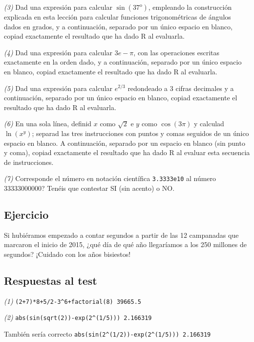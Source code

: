 \documentclass[]{book}
\theoremstyle{definition}
\theoremstyle{definition}
\theoremstyle{definition}
\theoremstyle{remark}
\begin{document}
\emph{(3)} Dad una expresión para calcular \(\sin(37^{\mathrm{o}})\), empleando la construcción explicada en esta lección para calcular funciones trigonométricas de ángulos dados en grados, y a continuación, separado por un único espacio en blanco, copiad exactamente el resultado que ha dado R al evaluarla.

\emph{(4)} Dad una expresión para calcular \(3e-\pi\), con las operaciones escritas exactamente en la orden dado, y a continuación, separado por un único espacio en blanco, copiad exactamente el resultado que ha dado R al evaluarla.

\emph{(5)} Dad una expresión para calcular \(e^{2/3}\) redondeado a 3 cifras decimales y a continuación, separado por un único espacio en blanco, copiad exactamente el resultado que ha dado R al evaluarla.

\emph{(6)} En una sola línea, definid \(x\) como \(\sqrt{2}\) e \(y\) como \(\cos(3\pi)\) y calculad \(\ln(x^{y})\); separad las tres instrucciones con puntos y comas seguidos de un único espacio en blanco. A continuación, separado por un espacio en blanco (sin punto y coma), copiad exactamente el resultado que ha dado R al evaluar esta secuencia de instrucciones.

\emph{(7)} Corresponde el número en notación científica \texttt{3.3333e10} al número 33333000000? Tenéis que contestar SI (sin acento) o NO.

\hypertarget{ejercicio}{%
\subsection*{Ejercicio}\label{ejercicio}}

Si hubiéramos empezado a contar segundos a partir de las 12 campanadas que marcaron el inicio de 2015, ¿qué día de qué año llegaríamos a los 250 millones de segundos? ¡Cuidado con los años bisiestos!

\hypertarget{respuestas-al-test}{%
\subsection*{Respuestas al test}\label{respuestas-al-test}}

\emph{(1)} \texttt{(2+7)*8+5/2-3\^{}6+factorial(8)\ 39665.5}

\emph{(2)} \texttt{abs(sin(sqrt(2))-exp(2\^{}(1/5)))\ 2.166319}

También sería correcto \texttt{abs(sin(2\^{}(1/2))-exp(2\^{}(1/5)))\ 2.166319}
\end{document}
